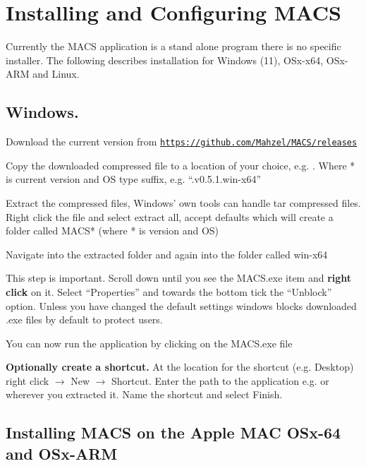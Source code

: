 \section{Installing and Configuring MACS}

Currently the MACS application is a stand alone program there is no specific installer. The following describes installation for Windows (11), OSx-x64, OSx-ARM and Linux.

\subsection{Windows.}

\begin{compactenum}
    \item Download the current version from \href{https://github.com/Mahzel/MACS/releases}{\texttt{https://github.com/Mahzel/MACS/releases}}
    \item Copy the downloaded compressed file to a location of your choice, e.g. . Where * is current version and OS type suffix, e.g. \enquote{.v0.5.1.win-x64}
    \item Extract the compressed files, Windows' own tools can handle tar compressed files. Right click the file and select extract all, accept defaults which will create a folder called MACS* (where * is version and OS)
    \item Navigate into the extracted folder and again into the folder called win-x64
    \item This step is important. Scroll down until you see the MACS.exe item and \textbf{right click} on it. Select \enquote{Properties} and towards the bottom tick the \enquote{Unblock} option. Unless you have changed the default settings windows blocks downloaded .exe files by default to protect users.
    \item You can now run the application by clicking on the MACS.exe file
    \item \textbf{Optionally create a shortcut.} At the location for the shortcut (e.g. Desktop) right click $\rightarrow$ New $\rightarrow$ Shortcut. Enter the path to the application e.g.  or wherever you extracted it. Name the shortcut and select Finish.
\end{compactenum}

\subsection{Installing MACS on the Apple MAC OSx-64 and OSx-ARM}

